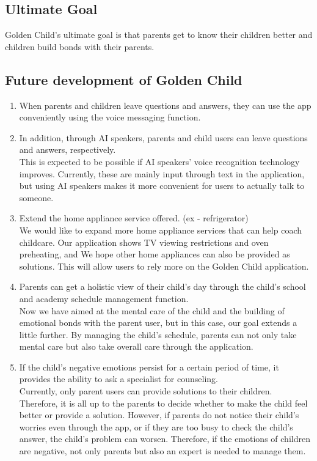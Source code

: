 \documentclass[conference]{IEEEtran}
\begin{document}
\subsection{Ultimate Goal}
Golden Child's ultimate goal is that parents get to know their children better and  children build bonds with their parents.
\newpage
\subsection{Future development of Golden Child}
\begin{enumerate}
    \item When parents and children leave questions and answers, they can use the app conveniently using the voice messaging function.
    \hfill\break
    \item In addition, through AI speakers, parents and child users can leave questions and answers, respectively. \\This is expected to be possible if AI speakers' voice recognition technology improves. Currently, these are mainly input through text in the application, but using AI speakers makes it more convenient for users to actually talk to someone.
    \hfill\break
    \item Extend the home appliance service offered. (ex - refrigerator)\\We would like to expand more home appliance services that can help coach childcare. Our application shows TV viewing restrictions and oven preheating, and We hope other home appliances can also be provided as solutions. This will allow users to rely more on the Golden Child application.
    \hfill\break
    \item Parents can get a holistic view of their child's day through the child's school and academy schedule management function.\\Now we have aimed at the mental care of the child and the building of emotional bonds with the parent user, but in this case, our goal extends a little further. By managing the child's schedule, parents can not only take mental care but also take overall care through the application.
    \hfill\break
    \item If the child's negative emotions persist for a certain period of time, it provides the ability to ask a specialist for counseling.\\Currently, only parent users can provide solutions to their children. Therefore, it is all up to the parents to decide whether to make the child feel better or provide a solution. However, if parents do not notice their child's worries even through the app, or if they are too busy to check the child's answer, the child's problem can worsen. Therefore, if the emotions of children are negative, not only parents but also an expert is needed to manage them.

\end{enumerate}
\end{document}
